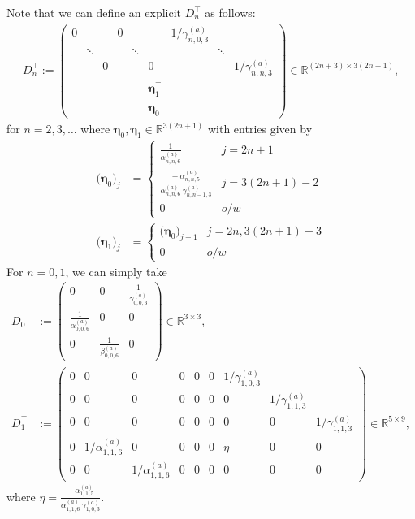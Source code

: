 \documentclass[11pt, oneside]{article}   	%
\newcommand{\R}{\mathbb{R}}
\newcommand{\Dnt}{D^\top_n}
\newcommand{\alphaa}{\alpha^{(a)}}
\newcommand{\betaa}{\beta^{(a)}}
\newcommand{\gammaa}{\gamma^{(a)}}
\begin{document}
Note that we can define an explicit \(\Dnt\) as follows:
\begin{align*}
	\Dnt := 
		\begin{pmatrix}
			0 & & & 0 & & & 1 / \gammaa_{n,0,3} & & \\
			& \ddots & & & \ddots & & & \ddots \\
			& & 0 & & & 0 & & & 1 / \gammaa_{n,n,3}  \\
			& & & & & \bm{\eta}^\top_{1} & & & \\
			& & & & & \bm{\eta}^\top_{0} & & &
		\end{pmatrix} \in \R^{(2n+3)\times3(2n+1)},
\end{align*}
for $n = 2, 3, \dots$ where $\bm{\eta}_{0}, \bm{\eta}_{1} \in \R^{3(2n+1)}$ with entries given by 
\begin{align*}
	\big(\bm{\eta}_{0}\big)_j &= 
		\begin{cases}
			\frac{1}{\alphaa_{n,n,6}} & j = 2n+1 \\
			\frac{- \: \alphaa_{n,n,5}}{\alphaa_{n,n,6} \: \gammaa_{n, n-1, 3}} & j = 3(2n+1) - 2 \\
			0 & o/w
		\end{cases} \\
	\big(\bm{\eta}_{1}\big)_j &= 
		\begin{cases}
			\big(\bm{\eta}_{0}\big)_{j+1} & j = 2n, 3(2n+1) - 3 \\
			0 & o/w
		\end{cases}
\end{align*}
For $n=0, 1$, we can simply take
\begin{align*}
	D^\top_0 &:= 
		\begin{pmatrix}
			0 & 0 & \frac{1}{\gammaa_{0,0,3}} \\
			\frac{1}{\alphaa_{0,0,6}} & 0 & 0 \\
			0 & \frac{1}{\betaa_{0,0,6}} & 0
		\end{pmatrix} \in \R^{3\times3}, \\
	D^\top_1 &:= 
		\begin{pmatrix}
			0 & 0 & 0 & 0 & 0 & 0 & 1 / \gammaa_{1,0,3} & & \\
			0 & 0 & 0 & 0 & 0 & 0 & 0 & 1 / \gammaa_{1,1,3} \\
			0 & 0 & 0 & 0 & 0 & 0 & 0 & 0 & 1 / \gammaa_{1,1,3}  \\
			0 & 1 / \alphaa_{1,1,6} & 0 & 0 & 0 & 0 & \eta & 0 & 0 \\
			0 & 0 & 1 / \alphaa_{1,1,6} & 0 & 0 & 0 & 0 & 0 & 0
		\end{pmatrix} \in \R^{5\times9},
\end{align*}
where $\eta = \frac{- \: \alphaa_{1,1,5}}{\alphaa_{1,1,6} \: \gammaa_{1, 0, 3}}$.
\end{document}
